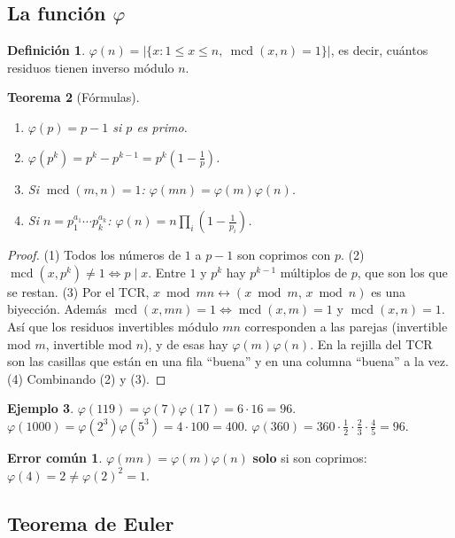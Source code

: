 \documentclass[11pt,a4paper]{article}
\newtheorem{teorema}{Teorema}[section]
\theoremstyle{definition}
\newtheorem{definicion}[teorema]{Definición}
\newtheorem{ejemplo}[teorema]{Ejemplo}
\newcommand{\mcd}{\operatorname{mcd}}
\theoremstyle{notait}
\theoremstyle{nota}
\newtheorem*{trampaX}{Error común}
\newenvironment{trampa}{\begin{trampaX}\leavevmode\marginpar{\raggedleft\vspace*{-0.9\baselineskip}\dbend}\ignorespaces}{\end{trampaX}}
\begin{document}
\subsection{La función $\varphi$}

\begin{definicion}
$\varphi(n)=\big|\{x : 1\le x\le n,\ \mcd(x,n)=1\}\big|$, es decir, cuántos residuos tienen inverso módulo $n$.
\end{definicion}

\begin{teorema}[Fórmulas]
\begin{enumerate}
\item $\varphi(p)=p-1$ si $p$ es primo.
\item $\varphi(p^k)=p^k-p^{k-1}=p^k\left(1-\tfrac1p\right)$.
\item Si $\mcd(m,n)=1$: $\varphi(mn)=\varphi(m)\varphi(n)$.
\item Si $n=p_1^{a_1}\cdots p_k^{a_k}$: $\varphi(n)=n\prod_{i}\left(1-\tfrac1{p_i}\right)$.
\end{enumerate}
\end{teorema}
\begin{proof}
(1) Todos los números de $1$ a $p-1$ son coprimos con $p$.
(2) $\mcd(x,p^k)\ne1\iff p\mid x$. Entre $1$ y $p^k$ hay $p^{k-1}$ múltiplos de $p$, que son los que se restan.
(3) Por el TCR, $x\bmod mn\leftrightarrow(x\bmod m,\,x\bmod n)$ es una biyección. Además $\mcd(x,mn)=1\iff\mcd(x,m)=1$ y $\mcd(x,n)=1$. Así que los residuos invertibles módulo $mn$ corresponden a las parejas (invertible mod $m$, invertible mod $n$), y de esas hay $\varphi(m)\varphi(n)$. En la rejilla del TCR son las casillas que están en una fila ``buena'' y en una columna ``buena'' a la vez.
(4) Combinando (2) y (3).
\end{proof}

\begin{ejemplo}
$\varphi(119)=\varphi(7)\varphi(17)=6\cdot16=96$. $\varphi(1000)=\varphi(2^3)\varphi(5^3)=4\cdot100=400$. $\varphi(360)=360\cdot\frac12\cdot\frac23\cdot\frac45=96$.
\end{ejemplo}

\begin{trampa}
$\varphi(mn)=\varphi(m)\varphi(n)$ \textbf{solo} si son coprimos: $\varphi(4)=2\ne\varphi(2)^2=1$.
\end{trampa}

\subsection{Teorema de Euler}
\end{document}
